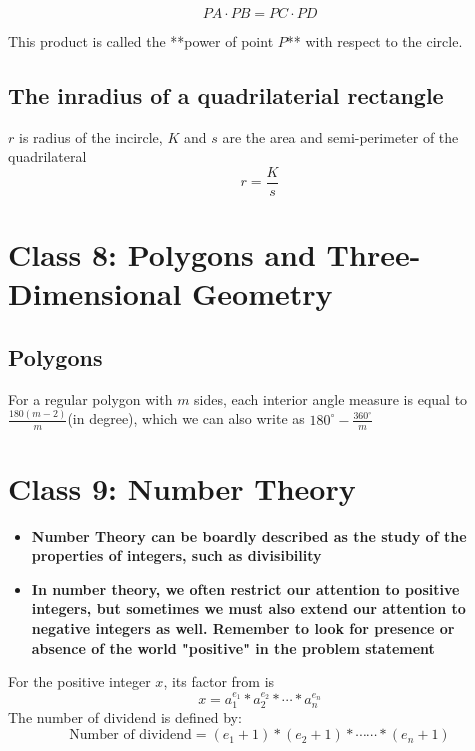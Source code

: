 \documentclass[10pt]{article}
\theoremstyle{remark}
\begin{document}
\[
PA \cdot PB = PC \cdot PD
\]

This product is called the **power of point $P$** with respect to the circle.

\subsection{The inradius of a quadrilaterial rectangle}
$r$ is radius of the incircle, $K$ and $s$ are the area and semi-perimeter of the quadrilateral
\[
	r = \frac{K}{s}
\]
\newpage

\section{Class 8: Polygons and Three-Dimensional Geometry}
\subsection{Polygons}
For a regular polygon with $m$ sides, each interior angle measure is equal to $\frac{180(m - 2)}{m}$(in degree), 
which we can also write as $180^{\circ} - \frac{360^{\circ}}{m}$

\newpage
\section{Class 9: Number Theory}

\begin{itemize}
	\item \textbf{Number Theory can be boardly described as the study of the properties of integers, such as divisibility}
	\item \textbf{In number theory, we often restrict our attention to positive integers, but sometimes we must also extend our attention to negative integers as well. Remember to look for presence or absence of the world
	"positive" in the problem statement}
\end{itemize}

For the positive integer $x$, its factor from is 
\[
	x = a_{1}^{e_{1}} * a_{2}^{e_{2}} * \cdots * a_{n}^{e_{n}}
\]
The number of dividend is defined by:
\[
	\text{Number of dividend} = (e_{1} + 1) * (e_{2} + 1) * \cdots\cdots * (e_{n} + 1) 
\]
\end{document}
